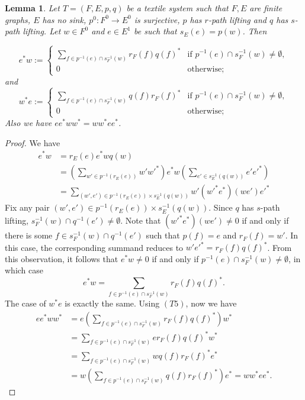 \documentclass[a4paper,reqno,12pt]{amsart}
\newtheorem{lem}[thm]{Lemma}
\theoremstyle{definition}
\theoremstyle{remark}
\begin{document}
\begin{lem}\label{lem swapping real and ghost}
Let $T=(F,E,p,q)$ be a textile system such that $F,E$ are finite graphs, $E$ has no sink, $p^0:F^0\longrightarrow E^0$ is surjective, $p$ has $r$-path lifting and $q$ has $s$-path lifting. Let $w\in F^0$ and $e\in E^1$ be such that $s_E(e)=p(w)$. Then 

$$e^*w:=
	\left\{
	\begin{array}{ll}
		\displaystyle{\sum_{f\in p^{-1}(e)\cap s_F^{-1}(w)}}r_F(f)q(f)^*  & \mbox{if } p^{-1}(e)\cap s_F^{-1}(w)\neq \emptyset, \\
		0 & \mbox{otherwise};
	\end{array}
	\right.$$
and 
$$w^*e:=
	\left\{
	\begin{array}{ll}
		\displaystyle{\sum_{f\in p^{-1}(e)\cap s_F^{-1}(w)}}q(f)r_F(f)^*  & \mbox{if } p^{-1}(e)\cap s_F^{-1}(w)\neq \emptyset, \\
		0 & \mbox{otherwise};
	\end{array}
	\right.$$
Also we have $ee^*ww^*=ww^*ee^*$. 
\end{lem}
\begin{proof}
We have 
\begin{align*}
e^*w&=r_E(e)e^*wq(w)\\
&=\left(\displaystyle{\sum_{w'\in p^{-1}(r_E(e))}} w'w'^*\right)e^*w \left(\displaystyle{\sum_{e'\in s_E^{-1}(q(w))}} e'e'^*\right)\\
&=\displaystyle{\sum_{(w',e')\in p^{-1}(r_E(e))\times s_E^{-1}(q(w))}} w'(w'^*e^*)(we')e'^*
\end{align*}
Fix any pair $(w',e')\in p^{-1}(r_E(e))\times s_E^{-1}(q(w))$. Since $q$ has $s$-path lifting, $s_F^{-1}(w)\cap q^{-1}(e')\neq \emptyset$. Note that $(w'^*e^*)(we')\neq 0$ if and only if there is some $f\in s_F^{-1}(w)\cap q^{-1}(e')$ such that $p(f)=e$ and $r_F(f)=w'$. In this case, the corresponding summand reduces to $w'e'^*=r_F(f)q(f)^*$. From this observation, it follows that $e^*w\neq 0$ if and only if $p^{-1}(e)\cap s_F^{-1}(w)\neq \emptyset$, in which case \[e^*w=\displaystyle{\sum_{f\in p^{-1}(e)\cap s_F^{-1}(w)}}r_F(f)q(f)^*.\]
The case of $w^*e$ is exactly the same. Using $(T5)$, now we have 
\begin{align*}
    ee^*ww^*&= e\left(\displaystyle{\sum_{f\in p^{-1}(e)\cap s_F^{-1}(w)}} r_F(f)q(f)^*\right)w^*\\
    &= \displaystyle{\sum_{f\in p^{-1}(e)\cap s_F^{-1}(w)}} er_F(f)q(f)^*w^*\\
    &= \displaystyle{\sum_{f\in p^{-1}(e)\cap s_F^{-1}(w)}} wq(f)r_F(f)^*e^*\\
    &= w\left(\displaystyle{\sum_{f\in p^{-1}(e)\cap s_F^{-1}(w)}} q(f)r_F(f)^*\right) e^*=ww^*ee^*.
\end{align*}
\end{proof}
\end{document}
